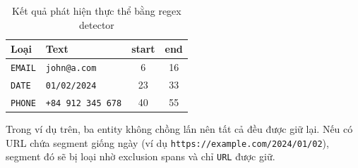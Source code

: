 \begin{table}[H]
      \centering
      \caption{Kết quả phát hiện thực thể bằng regex detector}
      \label{tab:regex_example}
      \renewcommand{\arraystretch}{1.3}
      \begin{tabular}{l l c c}
            \toprule
            \textbf{Loại}  & \textbf{Text}            & \textbf{start} & \textbf{end} \\
            \midrule
            \texttt{EMAIL} & \texttt{john@a.com}      & 6              & 16           \\
            \texttt{DATE}  & \texttt{01/02/2024}      & 23             & 33           \\
            \texttt{PHONE} & \texttt{+84 912 345 678} & 40             & 55           \\
            \bottomrule
      \end{tabular}
\end{table}

Trong ví dụ trên, ba entity không chồng lấn nên tất cả đều được giữ lại. Nếu
có URL chứa segment giống ngày (ví dụ
\texttt{https://example.com/2024/01/02}), segment đó sẽ bị loại nhờ exclusion
spans và chỉ \texttt{URL} được giữ.
